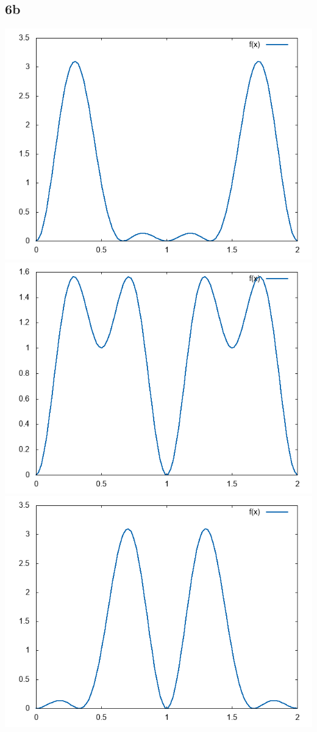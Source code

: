 \documentclass{article}
\begin{document}
\subsection*{6b}
\includegraphics[width=\textwidth]{plot1.png}
\includegraphics[width=\textwidth]{plot2.png}
\includegraphics[width=\textwidth]{plot3.png}
\end{document}

